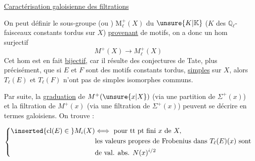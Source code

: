 \quad\uline{Caractérisation galoisienne des filtrations}

On peut définir le sous-groupe (ou ) $\mathrm{M}^+_\ell(X)$ du $\unsure{K|\mathbb K}$ ($K$ des  $\mathbb Q_\ell$-faisceaux constants tordus sur $X$) \uline{provenant} de motifs, on a donc un hom surjectif
\[
M^+(X)\longrightarrow M^+_\ell(X)
\]
 Cet hom est en fait \uline{bijectif}, car il résulte des conjectures de Tate, plus précisément, que si $E$ et $F$ sont des motifs constants tordus, \uline{simples}  sur $X$, alors $T_\ell(E)$ et $T_\ell(F)$  n'ont pas de  simples isomorphes communs.

Par suite,  la  \uline{graduation} de $M^+(\unsure{x|X})$ (via une partition de $\Sigma^+(x)$) et la filtration de $M^+(x)$ (via une filtration de $\Sigma^+(x)$) peuvent se décrire en termes galoisiens. On trouve  :

\[
\left\{\begin{aligned}
\inserted{\operatorname{cl}(E)\in{}}M_i(X)&\Longleftrightarrow\ \text{pour tt pt fini }x\text{ de }X,\\
&\text{les valeurs propres de Frobenius dans }T_\ell(E)(x)\text{ sont}\\
&\text{de val. abs. }N(x)^{i/2}
\end{aligned}\right.
\]

